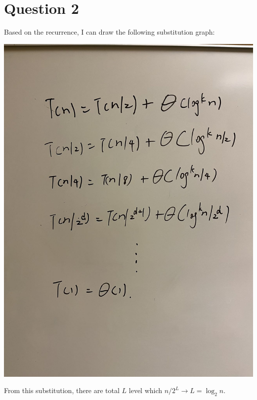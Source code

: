 \documentclass{article}
\begin{document}
\section*{Question 2}
Based on the recurrence, I can draw the following substitution graph:
\begin{center}
    \includegraphics[scale = 0.13]{cool2.jpg}
\end{center}
From this substitution, there are total $L$ level which $n/2^L \rightarrow L = \log_2 n$.
\end{document}

